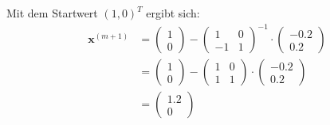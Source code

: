 \documentclass[11pt]{article}
\theoremstyle{plain}
\theoremstyle{definition}
\let\mbb\boldsymbol
\renewcommand\boldsymbol{\mbb}
\begin{document}
Mit dem Startwert $(1, 0)^T$ ergibt sich:
\begin{align*}
\mbb{x}^{(m+1)} &= 
\begin{pmatrix}
1 \\ 0
\end{pmatrix}
- 
\begin{pmatrix}
1 & 0 \\ -1 & 1
\end{pmatrix}
^{-1}
\cdot
\begin{pmatrix}
-0.2 \\ 0.2
\end{pmatrix} \\
&=
\begin{pmatrix}
1 \\ 0
\end{pmatrix}
- 
\begin{pmatrix}
1 & 0 \\ 1 & 1
\end{pmatrix}
\cdot
\begin{pmatrix}
-0.2 \\ 0.2
\end{pmatrix} \\
&=
\begin{pmatrix}
1.2 \\ 0
\end{pmatrix}
\end{align*}
\end{document}
